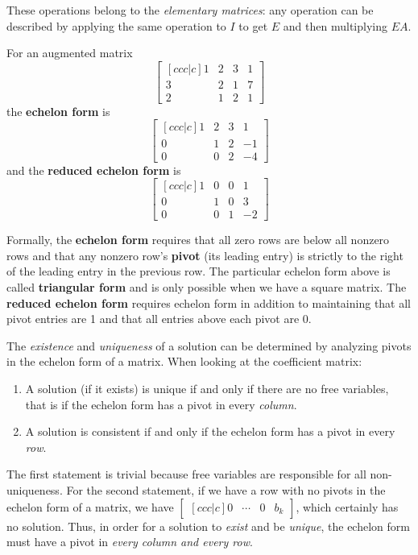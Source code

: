 These operations belong to the \textit{elementary matrices}: any operation can be described by applying the same operation to $I$ to get $E$ and then multiplying $EA$.

\begin{definition}
For an augmented matrix 
$$\begin{bmatrix}[ccc|c]
1 & 2 & 3 & 1 \\
3 & 2 & 1 & 7 \\
2 & 1 & 2 & 1
\end{bmatrix}$$
the \textbf{echelon form} is 
$$\begin{bmatrix}[ccc|c]
1 & 2 & 3 & 1 \\
0 & 1 & 2 & -1 \\
0 & 0 & 2 & -4
\end{bmatrix}$$
and the \textbf{reduced echelon form} is 
$$\begin{bmatrix}[ccc|c]
1 & 0 & 0 & 1 \\
0 & 1 & 0 & 3 \\
0 & 0 & 1 & -2
\end{bmatrix}$$

Formally, the \textbf{echelon form} requires that all zero rows are below all nonzero rows and that any nonzero row's \textbf{pivot} (its leading entry) is strictly to the right of the leading entry in the previous row. The particular echelon form above is called \textbf{triangular form} and is only possible when we have a square matrix. The \textbf{reduced echelon form} requires echelon form in addition to maintaining that all pivot entries are 1 and that all entries above each pivot are 0. 
\end{definition}

The \textit{existence} and \textit{uniqueness} of a solution can be determined by analyzing pivots in the echelon form of a matrix. When looking at the coefficient matrix: 
\begin{enumerate}
	\item A solution (if it exists) is unique if and only if there are no free variables, that is if the echelon form has a pivot in every \textit{column}. 
	\item A solution is consistent if and only if the echelon form has a pivot in every \textit{row}. 
\end{enumerate}
The first statement is trivial because free variables are responsible for all non-uniqueness. For the second statement, if we have a row with no pivots in the echelon form of a matrix, we have $\begin{bmatrix}[ccc|c]
0 & \cdots & 0 & b_{k}
\end{bmatrix}$, which certainly has no solution. Thus, in order for a solution to \textit{exist} and be \textit{unique}, the echelon form must have a pivot in \textit{every column and every row}. 

